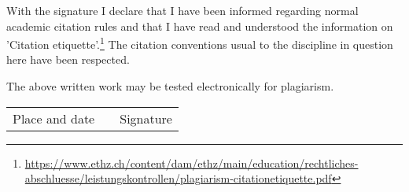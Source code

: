 With the signature I declare that I have been informed regarding normal academic citation rules and that I have read and understood the information on 'Citation etiquette'.\footnote{\url{https://www.ethz.ch/content/dam/ethz/main/education/rechtliches-abschluesse/leistungskontrollen/plagiarism-citationetiquette.pdf}} The citation conventions usual to the discipline in question here have been respected.

\vspace{0.5cm}

The above written work may be tested electronically for plagiarism.

\vspace{2cm}

\begin{tabular}{ p{5cm} p{1cm} p{5cm} }
  \cline{1-1} \cline{3-3}
  Place and date & & Signature \\
\end{tabular}
